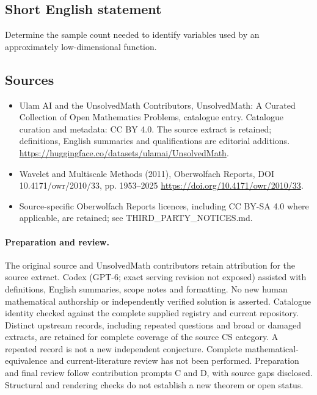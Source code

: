 \documentclass[11pt]{article}
\begin{document}
\subsection{Short English statement}
Determine the sample count needed to identify variables used by an approximately low-dimensional function.
\subsection{Sources}
\begin{itemize}
\item[\hypertarget{source:statement:1}{S1}] Ulam AI and the UnsolvedMath Contributors, UnsolvedMath: A Curated Collection of Open Mathematics Problems, catalogue entry. Catalogue curation and metadata: CC BY 4.0. The source extract is retained; definitions, English summaries and qualifications are editorial additions.
\url{https://huggingface.co/datasets/ulamai/UnsolvedMath}.
\item[\hypertarget{source:statement:2}{S2}] Wavelet and Multiscale Methods (2011), Oberwolfach Reports, DOI 10.4171/owr/2010/33, pp. 1953--2025
\url{https://doi.org/10.4171/owr/2010/33}.
\item Source-specific Oberwolfach Reports licences, including CC BY-SA 4.0 where applicable, are retained; see THIRD\_PARTY\_NOTICES.md.
\end{itemize}
\paragraph{Preparation and review.}
The original source and UnsolvedMath contributors retain attribution for the source extract. Codex (GPT-6; exact serving revision not exposed) assisted with definitions, English summaries, scope notes and formatting. No new human mathematical authorship or independently verified solution is asserted. Catalogue identity checked against the complete supplied registry and current repository. Distinct upstream records, including repeated questions and broad or damaged extracts, are retained for complete coverage of the source CS category. A repeated record is not a new independent conjecture. Complete mathematical-equivalence and current-literature review has not been performed. Preparation and final review follow contribution prompts C and D, with source gaps disclosed. Structural and rendering checks do not establish a new theorem or open status.
\label{end:statement}
\end{document}
